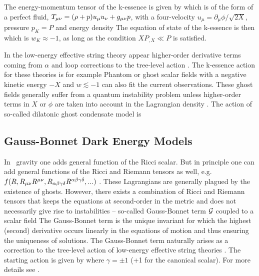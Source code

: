 The energy-momentum tensor of the k-essence is given by
which is of the form of a perfect fluid, $T_{\mu\nu}=(\rho+p)u_\mu u_\nu+g_{\mu\nu} p$, with a four-velocity $u_\mu=\partial_\mu\phi/\sqrt{2X}$, pressure $p_K=P$ and energy density
The equation of state of the k-essence is then
which is $w_K\approx-1$, as long as the condition $XP_{,X}\ll P$ is satisfied.

In the low-energy effective string theory appear higher-order derivative terms coming from $\alpha$ and loop corrections to the tree-level action \parencite{2003PhR...373....1G}. The k-essence action for these theories is for example
Phantom or ghost scalar fields with a negative kinetic energy $-X$ and $w\lesssim-1$ can also fit the current observations. These ghost fields generally suffer from a quantum instability problem unless higher-order terms in $X$ or $\phi$ are taken into account in the Lagrangian density \parencite{2010deto.book.....A}. The action of so-called dilatonic ghost condensate model is \parencite{2004JCAP...07..004P}
\subsection{Gauss-Bonnet Dark Energy Models}
In \fR\ gravity one adds general function of the Ricci scalar. But in principle one can add general functions of the Ricci and Riemann tensors as well, e.g. $f(R,R_{\mu\nu} R^{\mu\nu},R_{\alpha\beta\gamma\delta}R^{\alpha\beta\gamma\delta},...)$ \parencite{2005PhRvD..71f3513C}. These Lagrangians are generally plagued by the existence of ghosts.  However, there exists a combination of Ricci and Riemann tensors that keeps the equations at second-order in the metric and does not necessarily give rise to instabilities -- so-called Gauss-Bonnet term $\mathcal{G}$ coupled to a scalar field
The Gauss-Bonnet term is the unique invariant for which the highest (second) derivative occurs linearly in the equations of motion and thus ensuring the uniqueness of solutions. The Gauss-Bonnet term naturally arises as a correction to the tree-level action of low-energy effective string theories \parencite{2000PhR...337..343L}. The starting action is given by
where $\gamma=\pm1$ (+1 for the canonical scalar). For more details see \textcite{2005PhRvD..71l3509N,2006JCAP...06..004N,2013PhRvD..87h4037C}.
